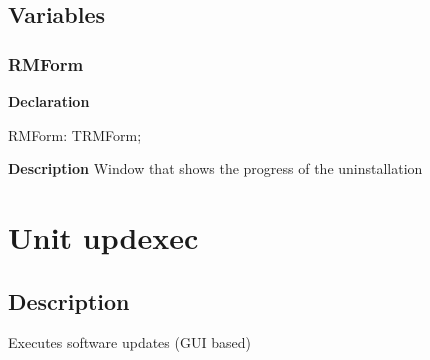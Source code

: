 \documentclass{report}
\newif\ifpdf
\begin{document}
\section{Variables}
\ifpdf
\subsection*{\large{\textbf{RMForm}}\normalsize\hspace{1ex}\hrulefill}
\else
\subsection*{RMForm}
\fi
\label{uninstall-RMForm}
\begin{list}{}{
\setlength{\itemindent}{0cm}
\setlength{\listparindent}{0cm}
\setlength{\leftmargin}{\evensidemargin}
\addtolength{\leftmargin}{\tmplength}
\settowidth{\labelsep}{X}
\addtolength{\leftmargin}{\labelsep}
\setlength{\labelwidth}{\tmplength}
}
\item[\textbf{Declaration}\hfill]
\ifpdf
\begin{flushleft}
\fi
\begin{ttfamily}
RMForm: TRMForm;\end{ttfamily}

\ifpdf
\end{flushleft}
\fi

\par
\item[\textbf{Description}]
Window that shows the progress of the uninstallation

\end{list}
\chapter{Unit updexec}
\label{updexec}
\section{Description}
Executes software updates (GUI based)
\end{document}
